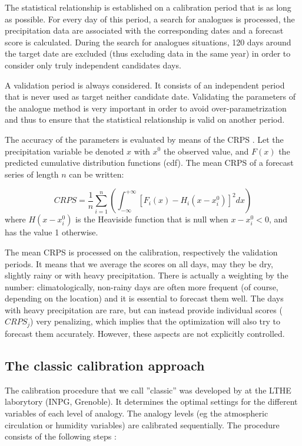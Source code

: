 \documentclass[twocol]{ametsoc}
\begin{document}
The statistical relationship is established on a calibration period that is as long as possible. For every day of this period, a search for analogues is processed, the precipitation data are associated with the corresponding dates and a forecast score is calculated. During the search for analogues situations, 120 days around the target date are excluded (thus excluding data in the same year) in order to consider only truly independent candidates days.

A validation period is always considered. It consists of an independent period that is never used as target neither candidate date. Validating the parameters of the analogue method is very important in order to avoid over-parametrization and thus to ensure that the statistical relationship is valid on another period.

The accuracy of the parameters is evaluated by means of the CRPS \citep[Continuous Ranked Probability Score,][]{Brown1974, Matheson1976, Hersbach2000}. Let the precipitation variable be denoted $x$ with $x^{0}$ the observed value, and $F(x)$ the predicted cumulative distribution functions (cdf). The mean CRPS of a forecast series of length $n$ can be written:

\begin{equation}
\label{eq:CRPS}
CRPS = \frac{1}{n} \sum_{i=1}^{n} \left(  \int_{-\infty}^{+\infty} \left[ F_{i}(x)-H_{i}(x-x_{i}^{0})\right]^{2} dx \right) 
\end{equation}
where $H(x-x_{i}^{0})$ is the Heaviside function that is null when $x-x_{i}^{0}<0$, and has the value 1 otherwise.

The mean CRPS is processed on the calibration, respectively the validation periods. It means that we average the scores on all days, may they be dry, slightly rainy or with heavy precipitation. There is actually a weighting by the number: climatologically, non-rainy days are often more frequent (of course, depending on the location) and it is essential to forecast them well. The days with heavy precipitation are rare, but can instead provide individual scores ($CRPS_{j}$) very penalizing, which implies that the optimization will also try to forecast them accurately. However, these aspects are not explicitly controlled.


\subsection{The classic calibration approach}

The calibration procedure that we call ''classic'' was developed by \citet{Bontron2004} at the LTHE laborytory (INPG, Grenoble). It determines the optimal settings for the different variables of each level of analogy. The analogy levels (eg the atmospheric circulation or humidity variables) are calibrated sequentially. The procedure consists of the following steps \citet{Bontron2004}:
\end{document}
